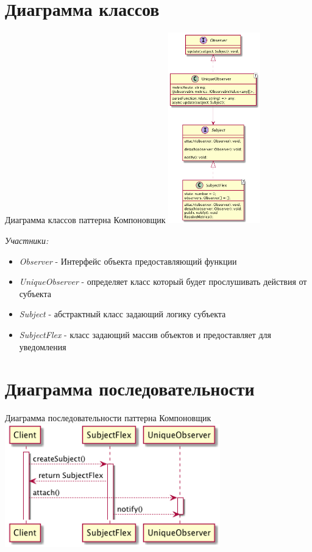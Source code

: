 \documentclass[PI,LAB]{HSEUniversity}
\begin{document}
\section{Диаграмма классов}
\begin{FIGURE}[h]{Диаграмма классов паттерна Компоновщик\label{fig:example-figure}}
    \includegraphics[width=0.3\textwidth]{../out/diagrams/observer-ts-class/observer-ts-class}
\end{FIGURE}
\emph{Участники:}
\begin{itemize}
    \item \emph{Observer} - Интерфейс объекта предоставляющий функции
    \item \emph{UniqueObserver} - определяет класс который будет прослушивать действия от субъекта
    \item \emph{Subject} - абстрактный класс задающий логику субъекта
    \item \emph{SubjectFlex} -  класс задающий массив объектов и предоставляет для уведомления
\end{itemize}
\pagebreak
\section{Диаграмма последовательности }

\begin{FIGURE}[h]{Диаграмма последовательности паттерна Компоновщик\label{fig:example-figure}}
    \includegraphics[width=0.7\textwidth]{../out/diagrams/observer-ts/observer-ts}
\end{FIGURE}
\end{document}
